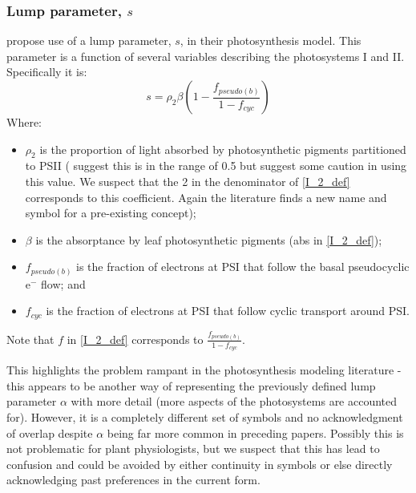 \documentclass[11pt]{article} %
\begin{document}
\subsubsection{Lump parameter, $s$}
\citet{YinUsingcombinedmeasurements2009} propose use of a lump parameter, $s$, in their photosynthesis model. This parameter is a function of several variables describing the photosystems I and II. Specifically it is:
\begin{equation} \label{lump_parameter_def}
s = \rho_2\beta\left(1 - \frac{f_{pseudo(b)}}{1 - f_{cyc}}\right)
\end{equation}
Where:
\begin{itemize}
 \item $\rho_2$ is the proportion of light absorbed by photosynthetic pigments partitioned to PSII (\citet{YinUsingcombinedmeasurements2009} suggest this is in the range of 0.5 but suggest some caution in using this value. We suspect that the 2 in the denominator of \eqref{I_2_def} corresponds to this coefficient. Again the literature finds a new name and symbol for a pre-existing concept);
 \item $\beta$ is the absorptance by leaf photosynthetic pigments (abs in \eqref{I_2_def});
 \item $f_{pseudo(b)}$ is the fraction of electrons at PSI that follow the basal pseudocyclic e$^-$ flow; and
 \item $f_{cyc}$ is the fraction of electrons at PSI that follow cyclic transport around PSI.
\end{itemize}
Note that $f$ in \eqref{I_2_def} corresponds to $ \frac{f_{pseudo(b)}}{1 - f_{cyc}}$.

This highlights the problem rampant in the photosynthesis modeling literature - this appears to be another way of representing the previously defined lump parameter $\alpha$ with more detail (more aspects of the photosystems are accounted for). However, it is a completely different set of symbols and no acknowledgment of overlap despite $\alpha$ being far more common in preceding papers. Possibly this is not problematic for plant physiologists, but we suspect that this has lead to confusion and could be avoided by either continuity in symbols or else directly acknowledging past preferences in the current form.
\end{document}
